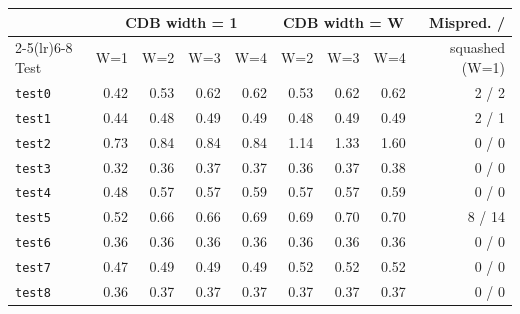 \begin{tabular}{@{}l rrrr rrr r@{}}\toprule
& \multicolumn{4}{c}{CDB width = 1} & \multicolumn{3}{c}{CDB width = W} & Mispred. /\\\cmidrule(lr){2-5}\cmidrule(lr){6-8}
Test & W=1 & W=2 & W=3 & W=4 & W=2 & W=3 & W=4 & squashed (W=1)\\\midrule
\texttt{test0} & 0.42 & 0.53 & 0.62 & 0.62 & 0.53 & 0.62 & 0.62 & 2 / 2\\
\texttt{test1} & 0.44 & 0.48 & 0.49 & 0.49 & 0.48 & 0.49 & 0.49 & 2 / 1\\
\texttt{test2} & 0.73 & 0.84 & 0.84 & 0.84 & 1.14 & 1.33 & 1.60 & 0 / 0\\
\texttt{test3} & 0.32 & 0.36 & 0.37 & 0.37 & 0.36 & 0.37 & 0.38 & 0 / 0\\
\texttt{test4} & 0.48 & 0.57 & 0.57 & 0.59 & 0.57 & 0.57 & 0.59 & 0 / 0\\
\texttt{test5} & 0.52 & 0.66 & 0.66 & 0.69 & 0.69 & 0.70 & 0.70 & 8 / 14\\
\texttt{test6} & 0.36 & 0.36 & 0.36 & 0.36 & 0.36 & 0.36 & 0.36 & 0 / 0\\
\texttt{test7} & 0.47 & 0.49 & 0.49 & 0.49 & 0.52 & 0.52 & 0.52 & 0 / 0\\
\texttt{test8} & 0.36 & 0.37 & 0.37 & 0.37 & 0.37 & 0.37 & 0.37 & 0 / 0\\
\bottomrule\end{tabular}
